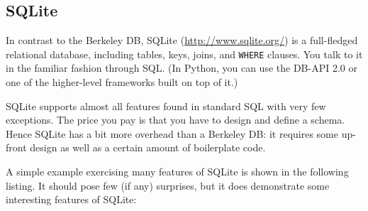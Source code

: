\subsection{SQLite}


In contrast to the Berkeley DB, SQLite (\url{http://www.sqlite.org/})
is a full-fledged relational
database, including tables, keys, joins, and \texttt{WHERE} clauses.
You talk to it in the familiar fashion through SQL.  (In Python, you
can use the DB-API 2.0 or one of the higher-level frameworks built on
top of it.)

SQLite supports almost all features found in standard SQL with very
few exceptions.  The price you pay is that you have to design and
define a schema. Hence SQLite has a bit more overhead than a Berkeley
DB: it requires some up-front design as well as a certain amount of
boilerplate code.

A simple example exercising many features of SQLite is shown in the
following listing.  It should pose few (if any) surprises, but it does
demonstrate some interesting features of SQLite:

